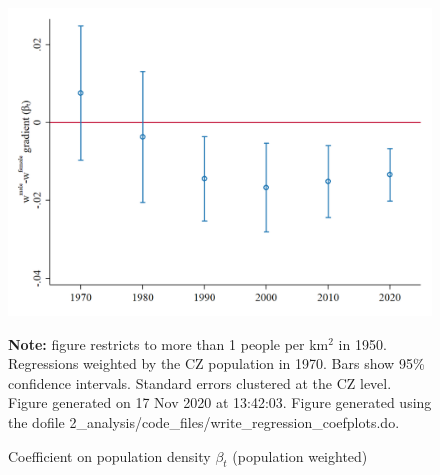 \begin{figure}[!h]
\centering
\caption{Coefficient on population density $ \beta_t $ (population weighted)}
\includegraphics[width=1\textwidth]{../2_analysis/output/figures/baseline_w_l_czone_density_full_time}
\par \begin{minipage}[h]{\textwidth}{\tiny\textbf{Note:} figure restricts to more than 1 people per km$^2$ in 1950. Regressions weighted by the CZ population in 1970. Bars show 95\% confidence intervals. Standard errors clustered at the CZ level. Figure generated on 17 Nov 2020 at 13:42:03. Figure generated using the dofile 2\_analysis/code\_files/write\_regression\_coefplots.do.}\end{minipage}
\end{figure}
